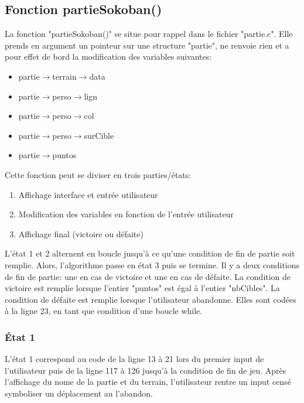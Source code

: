 \documentclass[10pt,a4paper,french,titlepage]{article}
\begin{document}
\subsection{Fonction partieSokoban()}\label{partie}
La fonction "partieSokoban()" se situe pour rappel dans le fichier "partie.c". Elle prends en argument un pointeur sur une structure "partie", ne renvoie rien et a pour effet de bord la modification des variables suivantes:
\begin{itemize}
\item partie$\rightarrow$terrain$\rightarrow$data
\item partie$\rightarrow$perso$\rightarrow$lign
\item partie$\rightarrow$perso$\rightarrow$col
\item partie$\rightarrow$perso$\rightarrow$surCible
\item partie$\rightarrow$puntos
\end{itemize}
Cette fonction peut se diviser en trois parties/états:
\begin{enumerate}
\item Affichage interface et entrée utilisateur
\item Modification des variables en fonction de l'entrée utilisateur
\item Affichage final (victoire ou défaite)
\end{enumerate}
L'état 1 et 2 alternent en boucle jusqu'à ce qu'une condition de fin de partie soit remplie. Alors, l'algorithme passe en état 3 puis se termine. Il y a deux conditions de fin de partie: une en cas de victoire et une en cas de défaite. La condition de victoire est remplie lorsque l'entier "puntos" est égal à l'entier "nbCibles". La condition de défaite est remplie lorsque l'utilisateur abandonne. Elles sont codées à la ligne 23, en tant que condition d'une boucle while.
\subsubsection*{État 1}
L'état 1 correspond au code de la ligne 13 à 21 lors du premier input de l'utilisateur puis de la ligne 117 à 126 jusqu'à la condition de fin de jeu. Après l'affichage du nome de la partie et du terrain, l'utilisateur rentre un input censé symboliser un déplacement au l'abandon.
\end{document}
